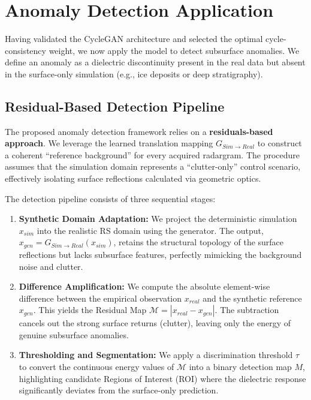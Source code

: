 \section{Anomaly Detection Application}
\label{sec:anomaly_detection_application}

Having validated the CycleGAN architecture and selected the optimal cycle-consistency weight, we now apply the model to detect subsurface anomalies.
We define an anomaly as a dielectric discontinuity present in the real data but absent in the surface-only simulation (e.g., ice deposits or deep stratigraphy).

\subsection{Residual-Based Detection Pipeline}
\label{subsec:residual_pipeline}

The proposed anomaly detection framework relies on a \textbf{residuals-based approach}.
We leverage the learned translation mapping $G_{Sim \to Real}$ to construct a coherent \enquote{reference background} for every acquired radargram.
The procedure assumes that the simulation domain represents a \enquote{clutter-only} control scenario, effectively isolating surface reflections calculated via geometric optics.

The detection pipeline consists of three sequential stages:
\begin{enumerate}
    \item \textbf{Synthetic Domain Adaptation:} We project the deterministic simulation $x_{sim}$ into the realistic RS domain using the generator. The output, $x_{gen} = G_{Sim \to Real}(x_{sim})$, retains the structural topology of the surface reflections but lacks subsurface features, perfectly mimicking the background noise and clutter.
    \item \textbf{Difference Amplification:} We compute the absolute element-wise difference between the empirical observation $x_{real}$ and the synthetic reference $x_{gen}$. This yields the Residual Map $\mathcal{M} = |x_{real} - x_{gen}|$. The subtraction cancels out the strong surface returns (clutter), leaving only the energy of genuine subsurface anomalies.
    \item \textbf{Thresholding and Segmentation:} We apply a discrimination threshold $\tau$ to convert the continuous energy values of $\mathcal{M}$ into a binary detection map $M$, highlighting candidate Regions of Interest (ROI) where the dielectric response significantly deviates from the surface-only prediction.
\end{enumerate}


